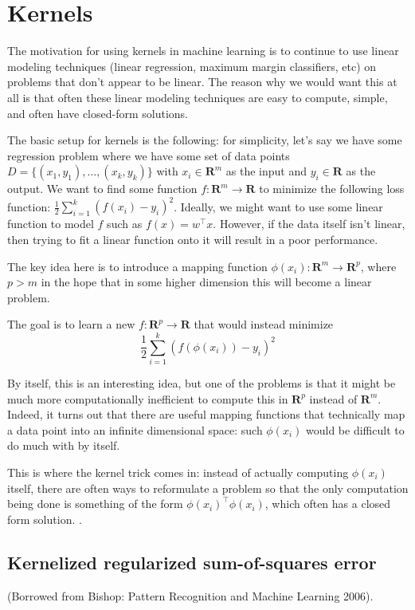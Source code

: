 \documentclass[answers,12pt]{exam}
\begin{document}
\section{Kernels}
The motivation for using kernels in machine learning is to continue to use linear modeling techniques (linear regression, maximum margin classifiers, etc) on problems that don't appear to be linear.
The reason why we would want this at all is that often these linear modeling techniques are easy to compute, simple, and often have closed-form solutions.

The basic setup for kernels is the following:
for simplicity, let's say we have some regression problem where we have some set of data points $D= \{(x_1,y_1),\dots, (x_k,y_k)\}$  with $x_i \in \mathbf{R}^m$ as the input and $y_i \in \mathbf{R}$ as the output.
We want to find some function $f: \mathbf{R}^m \to \mathbf{R}$ to minimize the following loss function: $\frac{1}{2}\sum_{i=1}^{k}{(f(x_i)-y_i)}^2$.
Ideally, we might want to use some linear function to model $f$ such as $f(x) = w^{\top}x$.
However, if the data itself isn't linear, then trying to fit a linear function onto it will result in a poor performance.

The key idea here is to introduce a mapping function $\phi(x_i): \mathbf{R}^m \to \mathbf{R}^p$, where $p>m$ in the hope that in some higher dimension this will become a linear problem. 

The goal is to learn a new $f: \mathbf{R}^p \to \mathbf{R}$ that would instead minimize
\[
    \frac{1}{2}\sum_{i=1}^{k}{(f(\phi(x_i))-y_i)}^2
\]

By itself, this is an interesting idea, but one of the problems is that it might be much more computationally inefficient to compute this in $\mathbf{R}^p$ instead of $\mathbf{R}^m$. 
Indeed, it turns out that there are useful mapping functions that technically map a data point into an infinite dimensional space: such $\phi(x_i)$ would be difficult to do much with by itself.

This is where the kernel trick comes in:
instead of actually computing $\phi(x_i)$ itself, there are often ways to reformulate a problem so that the only computation being done is something of the form $\phi(x_i)^{\top}\phi(x_i)$, which often has a closed form solution. .

\subsection{Kernelized regularized sum-of-squares error}
(Borrowed from Bishop: Pattern Recognition and Machine Learning 2006).
\end{document}
